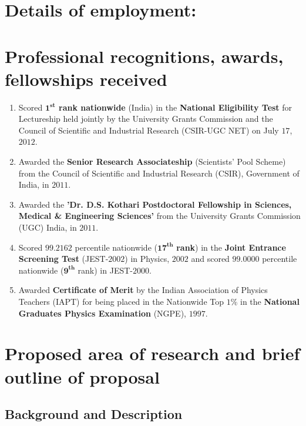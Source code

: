 \documentclass[a4paper,11pt,color]{article}
\begin{document}
\section{\sc Details of employment:}

\section{\sc Professional recognitions, awards, fellowships received}
\begin{enumerate}
\item
Scored \textbf{$\bm{1^{st}}$ rank nationwide} (India) in the \textbf{National Eligibility Test} for Lectureship held jointly by the University Grants Commission and the Council of Scientific and Industrial Research (CSIR-UGC NET) on July $17$, $2012$.
\item
Awarded the \textbf{Senior Research Associateship} (Scientists' Pool Scheme) from the Council of Scientific and Industrial Research (CSIR), Government of India, in $2011$.
\item
Awarded the \textbf{'Dr. D.S. Kothari Postdoctoral Fellowship in Sciences, Medical \& Engineering Sciences'} from the University Grants Commission (UGC) India, in $2011$.
\item
Scored $99.2162$ percentile nationwide ($\bm{17^{th}}$ \textbf{rank}) in the \textbf{Joint Entrance Screening Test} (JEST-$2002$) in Physics, $2002$ and scored $99.0000$ percentile nationwide ($\bm{9^{th}}$ rank) in JEST-$2000$.
\item Awarded \textbf{Certificate of Merit} by the Indian Association of Physics Teachers (IAPT) for being placed in the Nationwide Top $1\%$ in the \textbf{National Graduates Physics Examination} (NGPE), $1997$.
\end{enumerate}

\pagebreak
\section{\sc  Proposed area of research and brief outline of proposal}

\subsection{Background and Description }
\label{sec:sciTecQuality}
\end{document}
